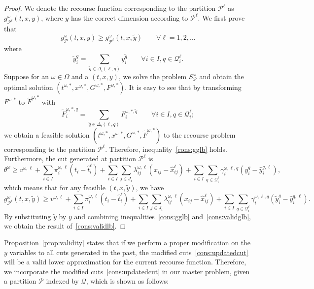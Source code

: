 \documentclass[11pt]{article}
\newcommand{\noi}{\noindent}
\begin{document}
	\begin{proof}
		We denote the recourse function corresponding to the partition \(\mathcal{P}^{\ell}\) as \(g^\omega_{\mathcal{P}^\ell}(t,x,y)\), where \(y\) has the correct dimension according to \(\mathcal{P}^\ell\). We first prove that 
		\begin{equation} \label{cons:gglb}
			g^\omega_{\mathcal{P}}(t,x,y) \geq g^{\omega}_{\mathcal{P}^\ell}(t,x,\tilde{y}) \qquad \forall \ell = 1,2,\dots
		\end{equation}
		where \[\tilde{y}_i^{q} =  \sum_{\tilde{q} \in \Delta_i(\ell,q)} y_i^{\tilde{q}} \qquad  \forall i \in I, q \in \mathcal{Q}^\ell_i. \]
		Suppose for an \(\omega \in \Omega\) and a \((t,x,y)\), we solve the problem \(S_{\mathcal{P}}^\omega\) and obtain the optimal solution \((t^{\omega,*},x^{\omega,*},G^{\omega,*},F^{\omega,*})\). It is easy to see that by transforming \(F^{\omega,*}\) to \(\tilde{F}^{\omega,*}\) with \[\tilde{F}^{\omega,*,q}_i = \sum_{\tilde{q} \in \Delta_i(\ell,q) }F_i^{\omega,*,\tilde{q}} \qquad  \forall i \in I, q \in \mathcal{Q}^\ell_i;\]
		we obtain a feasible solution \((t^{\omega,*},x^{\omega,*},G^{\omega,*},\tilde{F}^{\omega,*})\) to the recourse problem corresponding to the partition \(\mathcal{P}^\ell\). Therefore, inequality~\eqref{cons:gglb} holds. Furthermore, the cut generated at partition \(\mathcal{P}^\ell\) is
		\[\theta^\omega \geq v^{\omega,\ell} + \sum_{i \in I} \pi_i^{\omega,\ell} (t_i - \hat{t}_i^{\ell}) + \sum_{i \in I} \sum_{j \in J_i} \lambda_{ij}^{\omega,\ell} (x_{ij} - \hat{x}_{ij}^{\ell}) + \sum_{i \in I} \sum_{q \in \mathcal{Q}^{\ell}_i} \gamma_{i}^{\omega,\ell,q} \left( y_i^{q} - \hat{y}_i^{q,\ell} \right),\]
		 which means that for any feasible \((t,x,\tilde{y})\), we have 
		 \begin{equation} \label{cons:validglb}
		 	g^\omega_{\mathcal{P}^\ell}(t,x,\tilde{y}) \geq v^{\omega,\ell} + \sum_{i \in I} \pi_i^{\omega,\ell} (t_i - \hat{t}_i^{\ell}) + \sum_{i \in I} \sum_{j \in J_i} \lambda_{ij}^{\omega,\ell} (x_{ij} - \hat{x}_{ij}^{\ell}) + \sum_{i \in I} \sum_{q \in \mathcal{Q}^{\ell}_i} \gamma_{i}^{\omega,\ell,q} \left( \tilde{y}_i^{q} - \hat{y}_i^{q,\ell} \right).
		 \end{equation}
		 By substituting \(\tilde{y}\) by \(y\) and combining inequalities~\eqref{cons:gglb} and~\eqref{cons:validglb}, we obtain the result of~\eqref{cons:validlb}.
	\end{proof}
	\noi Proposition~\ref{prop:validity} states that if we perform a proper modification on the \(y\) variables to all cuts generated in the past, the modified cuts~\eqref{cons:updatedcut} will be a valid lower approximation for the current recourse function. Therefore, we incorporate the modified cuts~\eqref{cons:updatedcut} in our master problem, given a partition \(\mathcal{P}\) indexed by \(\mathcal{Q}\), which is shown as follows:
\end{document}
